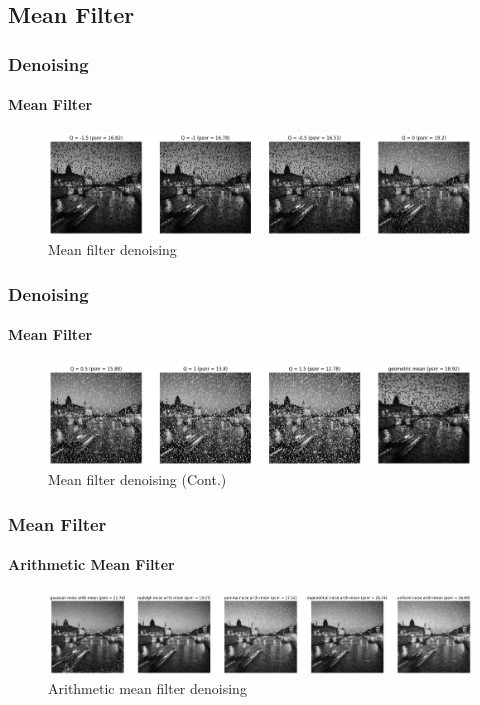 \documentclass[
	11pt, %
	aspectratio=169, %
]{beamer}
\begin{document}
	\subsection{Mean Filter}

		\begin{frame}
			\frametitle{Denoising}
			\framesubtitle{Mean Filter}

			\begin{figure}[H]
				\includegraphics[width = \linewidth]{mean_filter_1.png}
				\caption{Mean filter denoising}
				\label{fig:mean_1}
			 \end{figure}
		\end{frame}

		\begin{frame}
			\frametitle{Denoising}
			\framesubtitle{Mean Filter}

			\begin{figure}[H]
				\includegraphics[width = \linewidth]{mean_filter_2.png}
				\caption{Mean filter denoising (Cont.)}
				\label{fig:mean_2}
			 \end{figure}
		\end{frame}

		\begin{frame}
			\frametitle{Mean Filter}
			\framesubtitle{Arithmetic Mean Filter}

			\begin{figure}[H]
				\includegraphics[width = \linewidth]{mean_filter_random_noise_1.png}
				\caption{Arithmetic mean filter denoising}
				\label{fig:arith_mean}
			\end{figure}
		\end{frame}
\end{document}
